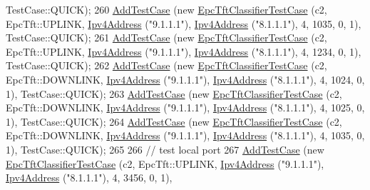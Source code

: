 \begin{DoxyCode}
      TestCase::QUICK);
260   \hyperlink{classns3_1_1TestCase_a3718088e3eefd5d6454569d2e0ddd835}{AddTestCase} (\textcolor{keyword}{new} \hyperlink{classEpcTftClassifierTestCase}{EpcTftClassifierTestCase} (c2, EpcTft::UPLINK,   
      \hyperlink{classns3_1_1Ipv4Address}{Ipv4Address} (\textcolor{stringliteral}{"9.1.1.1"}), \hyperlink{classns3_1_1Ipv4Address}{Ipv4Address} (\textcolor{stringliteral}{"8.1.1.1"}),     4,     1035,     0,    1), 
      TestCase::QUICK);
261   \hyperlink{classns3_1_1TestCase_a3718088e3eefd5d6454569d2e0ddd835}{AddTestCase} (\textcolor{keyword}{new} \hyperlink{classEpcTftClassifierTestCase}{EpcTftClassifierTestCase} (c2, EpcTft::UPLINK,   
      \hyperlink{classns3_1_1Ipv4Address}{Ipv4Address} (\textcolor{stringliteral}{"9.1.1.1"}), \hyperlink{classns3_1_1Ipv4Address}{Ipv4Address} (\textcolor{stringliteral}{"8.1.1.1"}),     4,     1234,     0,    1), 
      TestCase::QUICK);
262   \hyperlink{classns3_1_1TestCase_a3718088e3eefd5d6454569d2e0ddd835}{AddTestCase} (\textcolor{keyword}{new} \hyperlink{classEpcTftClassifierTestCase}{EpcTftClassifierTestCase} (c2, EpcTft::DOWNLINK, 
      \hyperlink{classns3_1_1Ipv4Address}{Ipv4Address} (\textcolor{stringliteral}{"9.1.1.1"}), \hyperlink{classns3_1_1Ipv4Address}{Ipv4Address} (\textcolor{stringliteral}{"8.1.1.1"}),     4,     1024,     0,    1), 
      TestCase::QUICK);
263   \hyperlink{classns3_1_1TestCase_a3718088e3eefd5d6454569d2e0ddd835}{AddTestCase} (\textcolor{keyword}{new} \hyperlink{classEpcTftClassifierTestCase}{EpcTftClassifierTestCase} (c2, EpcTft::DOWNLINK, 
      \hyperlink{classns3_1_1Ipv4Address}{Ipv4Address} (\textcolor{stringliteral}{"9.1.1.1"}), \hyperlink{classns3_1_1Ipv4Address}{Ipv4Address} (\textcolor{stringliteral}{"8.1.1.1"}),     4,     1025,     0,    1), 
      TestCase::QUICK);
264   \hyperlink{classns3_1_1TestCase_a3718088e3eefd5d6454569d2e0ddd835}{AddTestCase} (\textcolor{keyword}{new} \hyperlink{classEpcTftClassifierTestCase}{EpcTftClassifierTestCase} (c2, EpcTft::DOWNLINK, 
      \hyperlink{classns3_1_1Ipv4Address}{Ipv4Address} (\textcolor{stringliteral}{"9.1.1.1"}), \hyperlink{classns3_1_1Ipv4Address}{Ipv4Address} (\textcolor{stringliteral}{"8.1.1.1"}),     4,     1035,     0,    1), 
      TestCase::QUICK);
265 
266   \textcolor{comment}{// test local port}
267   \hyperlink{classns3_1_1TestCase_a3718088e3eefd5d6454569d2e0ddd835}{AddTestCase} (\textcolor{keyword}{new} \hyperlink{classEpcTftClassifierTestCase}{EpcTftClassifierTestCase} (c2, EpcTft::UPLINK,   
      \hyperlink{classns3_1_1Ipv4Address}{Ipv4Address} (\textcolor{stringliteral}{"9.1.1.1"}), \hyperlink{classns3_1_1Ipv4Address}{Ipv4Address} (\textcolor{stringliteral}{"8.1.1.1"}),     4,     3456,     0,    1), 

\end{DoxyCode}
